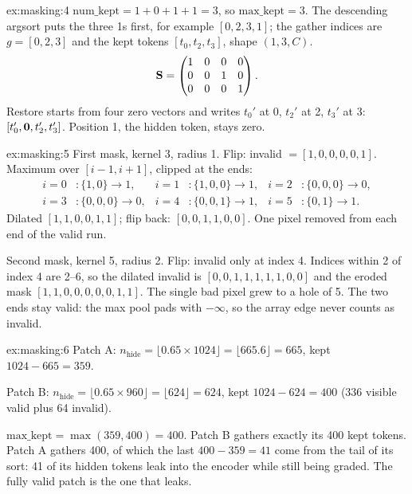\begin{solution}{ex:masking:4}
$\text{num\_kept} = 1 + 0 + 1 + 1 = 3$, so $\text{max\_kept} = 3$. The descending argsort puts the three
1s first, for example $[0, 2, 3, 1]$; the gather indices are $g = [0, 2, 3]$ and the kept tokens
$[t_0, t_2, t_3]$, shape $(1, 3, C)$.
\[
\mathbf{S} = \begin{pmatrix} 1&0&0&0\\ 0&0&1&0\\ 0&0&0&1 \end{pmatrix}.
\]
Restore starts from four zero vectors and writes $t_0'$ at 0, $t_2'$ at 2, $t_3'$ at 3:
$[t_0', \mathbf{0}, t_2', t_3']$. Position 1, the hidden token, stays zero.
\end{solution}

\begin{solution}{ex:masking:5}
First mask, kernel 3, radius 1. Flip: invalid $= [1, 0, 0, 0, 0, 1]$. Maximum over $[i-1, i+1]$,
clipped at the ends:
\begin{align*}
i=0&: \{1, 0\} \to 1, & i=1&: \{1, 0, 0\} \to 1, & i=2&: \{0, 0, 0\} \to 0,\\
i=3&: \{0, 0, 0\} \to 0, & i=4&: \{0, 0, 1\} \to 1, & i=5&: \{0, 1\} \to 1 .
\end{align*}
Dilated $[1, 1, 0, 0, 1, 1]$; flip back: $[0, 0, 1, 1, 0, 0]$. One pixel removed from each end of the
valid run.

Second mask, kernel 5, radius 2. Flip: invalid only at index 4. Indices within 2 of index 4 are 2--6, so
the dilated invalid is $[0, 0, 1, 1, 1, 1, 1, 0, 0]$ and the eroded mask $[1, 1, 0, 0, 0, 0, 0, 1, 1]$.
The single bad pixel grew to a hole of 5. The two ends stay valid: the max pool pads with $-\infty$, so
the array edge never counts as invalid.
\end{solution}

\begin{solution}{ex:masking:6}
Patch A: $n_{\text{hide}} = \lfloor 0.65 \times 1024 \rfloor = \lfloor 665.6 \rfloor = 665$, kept
$1024 - 665 = 359$.

Patch B: $n_{\text{hide}} = \lfloor 0.65 \times 960 \rfloor = \lfloor 624 \rfloor = 624$, kept
$1024 - 624 = 400$ (336 visible valid plus 64 invalid).

$\text{max\_kept} = \max(359, 400) = 400$. Patch B gathers exactly its 400 kept tokens. Patch A gathers
400, of which the last $400 - 359 = 41$ come from the tail of its sort: 41 of its hidden tokens leak
into the encoder while still being graded. The fully valid patch is the one that leaks.
\end{solution}
